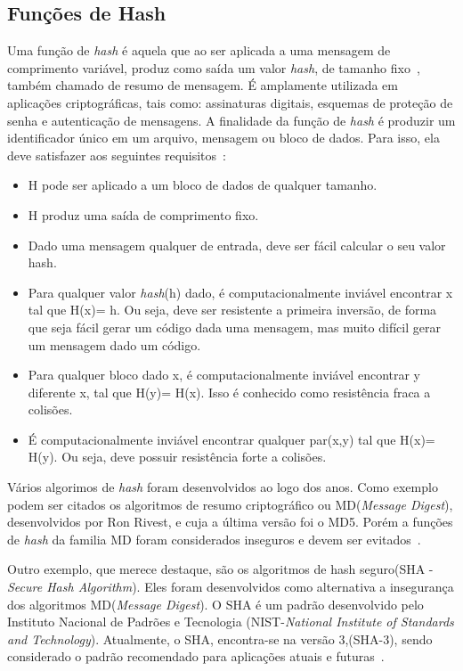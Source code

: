 \subsection{Funções de Hash}
Uma função de \emph{hash} é aquela que ao ser aplicada a uma mensagem de comprimento variável, produz como saída um valor \emph{hash}, de tamanho fixo~\cite{Schneier1995}, também chamado de resumo de mensagem. É amplamente utilizada em aplicações criptográficas, tais como: assinaturas digitais, esquemas de proteção de senha e autenticação de mensagens. A finalidade da função de \emph{hash} é produzir um identificador único em um arquivo, mensagem ou bloco de dados. Para isso, ela deve satisfazer aos seguintes requisitos~\cite{stallings2008}:
\begin{itemize}
\item H pode ser aplicado a um bloco de dados de qualquer tamanho.
\item H produz uma saída de comprimento fixo.
\item Dado uma mensagem qualquer de entrada, deve ser fácil calcular o seu valor hash.
\item Para qualquer valor \emph{hash}(h) dado, é computacionalmente inviável encontrar x tal que H(x)= h. Ou seja,  deve ser resistente a primeira inversão, de forma que seja fácil gerar um código dada uma mensagem, mas muito difícil gerar um mensagem dado um código.
\item Para qualquer bloco dado x, é computacionalmente inviável encontrar y diferente x, tal que H(y)= H(x). Isso é conhecido como resistência fraca a colisões.

\item É computacionalmente inviável encontrar qualquer par(x,y) tal que H(x)= H(y). Ou seja, deve possuir resistência forte a colisões.

\end{itemize}

Vários algorimos de \emph{hash} foram desenvolvidos ao logo dos anos. Como exemplo podem ser citados os algoritmos de resumo criptográfico ou MD(\emph{Message Digest}), desenvolvidos por Ron Rivest, e cuja a última versão foi o MD5. Porém a funções de \emph{hash} da familia MD foram considerados inseguros e devem ser evitados~\cite{forouzan2013redes}.

Outro exemplo, que merece destaque, são os algoritmos de hash seguro(SHA - \emph{Secure Hash Algorithm}). Eles foram desenvolvidos como alternativa a insegurança dos algoritmos MD(\emph{Message Digest}). O SHA é um padrão desenvolvido pelo Instituto Nacional de Padrões e Tecnologia (NIST-\emph{National Institute of Standards and Technology}). Atualmente, o SHA, encontra-se na versão 3,(SHA-3), sendo considerado o padrão recomendado para aplicações atuais e futuras~\cite{forouzan2013redes}.

